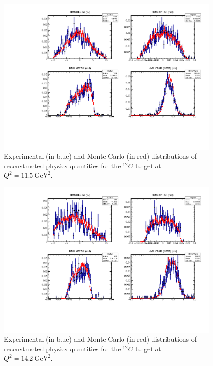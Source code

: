\begin{figure}[!h]
    \centering
    \includegraphics[page=3,width=1.0\textwidth]{pass5_report/Report_c115.pdf}
    \caption{
            Experimental (in blue) and Monte Carlo (in red) distributions of
            reconstructed physics quantities for
            the ${}^{12}C$ target at $Q^2=\SI{11.5}{\giga\electronvolt\squared}$.
            }
    \label{fig:Report_c115.pdf}
\end{figure}


\begin{figure}[!h]
    \centering
    \includegraphics[page=3,width=1.0\textwidth]{pass5_report/Report_c143_sm.pdf}
    \caption{
            Experimental (in blue) and Monte Carlo (in red) distributions of
            reconstructed physics quantities for
            the ${}^{12}C$ target at $Q^2=\SI{14.2}{\giga\electronvolt\squared}$.
            }
    \label{fig:Report_c143_sm.pdf}
\end{figure}


